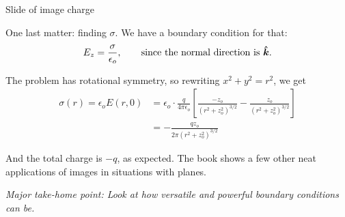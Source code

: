 \documentclass{article}
\begin{document}
\begin{mdframed}[backgroundcolor=black!4, align=center, userdefinedwidth=0.8\textwidth, topline=false, bottomline = false, leftline = false, rightline = false, frametitle = {Interlude}]

\begin{center}
Slide of image charge
\end{center}

\end{mdframed}

One last matter: finding $\sigma$. We have a boundary condition for that:
\begin{equation*}
    E_z = \frac{\sigma}{\epsilon_o}, \qquad \text{since the normal direction is $\bm{\hat{k}}$.}
\end{equation*}

The problem has rotational symmetry, so rewriting $x^2 + y^2 = r^2$, we get
\begin{align*}
    \sigma (r) = \epsilon_o E(r, 0) &= \epsilon_o \cdot \frac{q}{4\pi\epsilon_o} \left[ \frac{-z_o}{\left( r^2 + z_o^2 \right)^{3/2}} - \frac{z_o}{\left( r^2 + z_o^2 \right)^{3/2}} \right] \\
                                    &= -\frac{q z_o}{2\pi \left( r^2 + z_o^2 \right)^{3/2}}
\end{align*}

And the total charge is $-q$, as expected. The book shows a few other neat applications of images in situations with planes.

\vspace{1em}

\emph{Major take-home point: Look at how versatile and powerful boundary conditions can be.}
\end{document}
